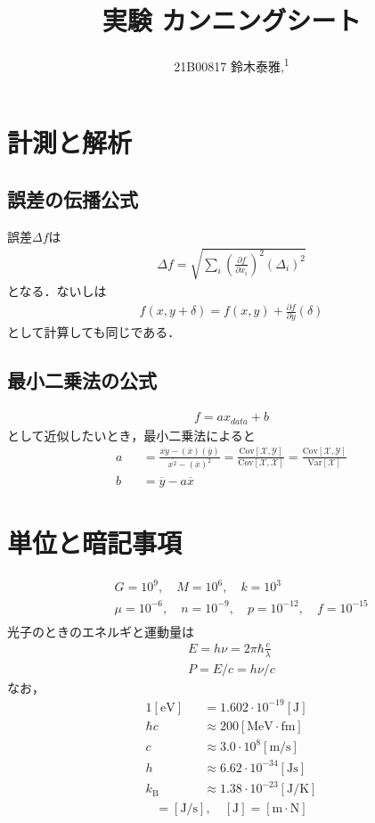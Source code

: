 \documentclass[12pt,dvipdfmx]{jsarticle}
\newcommand\authormark[1]{\textsuperscript{#1}}
\begin{document}
\title{実験 カンニングシート}

\author{21B00817 鈴木泰雅,\authormark{1}}
\section*{\Large{計測と解析}}

\subsection*{誤差の伝播公式}
誤差$\Delta f$は
\begin{eqnarray}
  \Delta f= \sqrt{ \sum_i \left(\frac{\partial f}{\partial x_i}\right)^2(\Delta_i)^2 }
\end{eqnarray}
となる．ないしは
\begin{eqnarray}
  f(x,y+\delta) = f(x,y) + \frac{\partial f}{\partial y}(\delta)
\end{eqnarray}
として計算しても同じである．
\subsection*{最小二乗法の公式}
\begin{eqnarray}
  f= ax_{data} + b
\end{eqnarray}
として近似したいとき，最小二乗法によると
\begin{eqnarray}
  a &&= \frac{\overline{xy} - (\overline{x})(\overline{y})}{\overline{x^2} - (\overline{x})^2} = \frac{\mathrm{Cov}[\mathcal{X},\mathcal{Y}]}{\mathrm{Cov}[\mathcal{X}, \mathcal{X}]} = \frac{\mathrm{Cov}[\mathcal{X},\mathcal{Y}]}{\mathrm{Var}[\mathcal{X}]}\\
  b &&= \overline{y} - a\overline{x}
\end{eqnarray}
\section*{\Large{単位と暗記事項}}
\begin{eqnarray}
  &&G= 10^{9},\quad M=10^{6},\quad k = 10^{3} \\
  &&\mu= 10^{-6},\quad n=10^{-9},\quad p = 10^{-12},\quad f = 10^{-15} \\ 
\end{eqnarray}
光子のときのエネルギと運動量は
\begin{eqnarray}
  E = h\nu = 2\pi\hbar\frac{c}{\lambda}\\
  P = E/c = h\nu/c
\end{eqnarray}
なお，
\begin{eqnarray}
  1[\text{eV}] &&= 1.602\cdot 10^{-19}[\text{J}]\\
  \hbar c &&\approx 200[\text{MeV}\cdot\text{fm}]\\
   c &&\approx 3.0\cdot 10^{8}[\text{m}/\text{s}]\\
   h &&\approx 6.62\cdot 10^{-34}[\text{Js}]\\
   k_{\text{B}}&&\approx 1.38\cdot 10^{-23}[\text{J}/\text{K}]
\end{eqnarray}
\begin{eqnarray}
  [\text{W}]= [\text{J}/\text{s}],\quad [\text{J}]= [\text{m}\cdot\text{N}]
\end{eqnarray}
\end{document}
